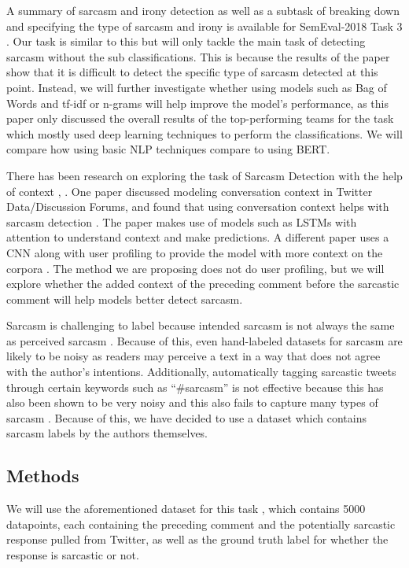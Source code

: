 \documentclass[11pt,a4paper]{article}
\begin{document}
A summary of sarcasm and irony detection as well as a subtask of breaking down and specifying the type of sarcasm and irony is available for SemEval-2018 Task 3 \cite{van-hee-etal-2018-semeval}. Our task is similar to this but will only tackle the main task of detecting sarcasm without the sub classifications. This is because the results of the paper show that it is difficult to detect the specific type of sarcasm detected at this point. Instead, we will further investigate whether using models such as Bag of Words and tf-idf or n-grams will help improve the model's performance, as this paper only discussed the overall results of the top-performing teams for the task which mostly used deep learning techniques to perform the classifications. We will compare how using basic NLP techniques compare to using BERT.

There has been research on exploring the task of Sarcasm Detection with the help of context \cite{Ghosh-Muresan}, \cite{hazarika}. One paper discussed modeling conversation context in Twitter Data/Discussion Forums, and found that using conversation context helps with sarcasm detection \cite{Ghosh-Muresan}. The paper makes use of models such as LSTMs with attention to understand context and make predictions. A different paper uses a CNN along with user profiling to provide the model with more context on the corpora \cite{hazarika}. The method we are proposing does not do user profiling, but we will explore whether the added context of the preceding comment before the sarcastic comment will help models better detect sarcasm.

Sarcasm is challenging to label because intended sarcasm is not always the same as perceived sarcasm \cite{oprea}. Because of this, even hand-labeled datasets for sarcasm are likely to be noisy as readers may perceive a text in a way that does not agree with the author's intentions. Additionally, automatically tagging sarcastic tweets through certain keywords such as ``\#sarcasm'' is not effective because this has also been shown to be very noisy and this also fails to capture many types of sarcasm \cite{oprea}. Because of this, we have decided to use a dataset which contains sarcasm labels by the authors themselves.

\subsection{Methods}
We will use the aforementioned dataset for this task \cite{Ghosh-Muresan}, which contains 5000 datapoints, each containing the preceding comment and the potentially sarcastic response pulled from Twitter, as well as the ground truth label for whether the response is sarcastic or not.
\end{document}
